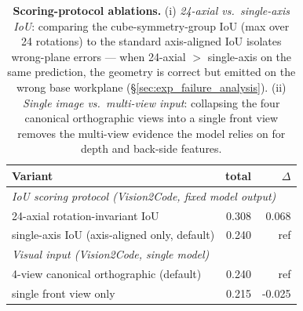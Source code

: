 \begin{table}[t]
\centering
\small
\setlength{\tabcolsep}{6pt}
\caption{\textbf{Scoring-protocol ablations.} (i) \emph{24-axial vs.\ single-axis IoU}: comparing the cube-symmetry-group IoU (max over 24 rotations) to the standard axis-aligned IoU isolates wrong-plane errors --- when 24-axial $>$ single-axis on the same prediction, the geometry is correct but emitted on the wrong base workplane (\S\ref{sec:exp_failure_analysis}). (ii) \emph{Single image vs.\ multi-view input}: collapsing the four canonical orthographic views into a single front view removes the multi-view evidence the model relies on for depth and back-side features. 
}
\label{tab:ablation}
\begin{tabular}{lrr}
\toprule
Variant & total & $\Delta$ \\
\midrule
\multicolumn{3}{l}{\emph{IoU scoring protocol (Vision2Code, fixed model output)}} \\
24-axial rotation-invariant IoU        & 0.308   & 0.068 \\
single-axis IoU (axis-aligned only, default)               & 0.240   & ref \\
\midrule
\multicolumn{3}{l}{\emph{Visual input (Vision2Code, single model)}} \\
4-view canonical orthographic (default)           & 0.240   & ref \\
single front view only                            & 0.215   & -0.025 \\
\bottomrule
\end{tabular}
\end{table}
